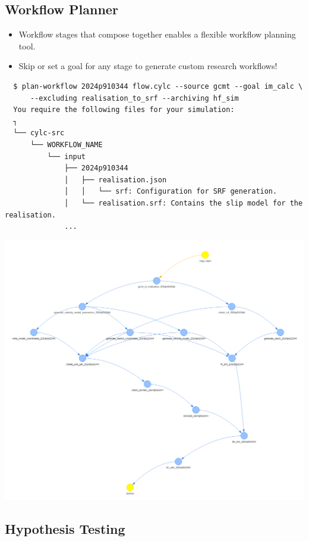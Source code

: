 \documentclass[11pt]{article}
\begin{document}
\subsection*{Workflow Planner}
\label{sec:org6e5d660}
\begin{itemize}
\item Workflow stages that compose together enables a flexible workflow planning tool.
\item Skip or set a goal for any stage to generate custom research workflows!
\end{itemize}
\begin{verbatim}
  $ plan-workflow 2024p910344 flow.cylc --source gcmt --goal im_calc \
      --excluding realisation_to_srf --archiving hf_sim
  You require the following files for your simulation:
  ┐
  └── cylc-src
      └── WORKFLOW_NAME
          └── input
              ├── 2024p910344
              │   ├── realisation.json
              │   │   └── srf: Configuration for SRF generation.
              │   └── realisation.srf: Contains the slip model for the realisation.
              ...
\end{verbatim}
\begin{center}
\includegraphics[width=.9\linewidth]{workflow_graph.png}
\end{center}
\subsection*{Hypothesis Testing}
\label{sec:org1441efc}
\end{document}
